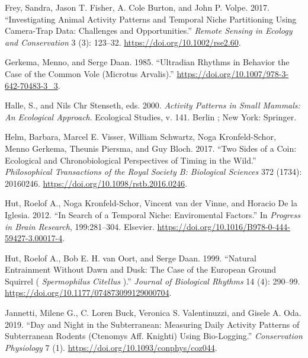 \documentclass[msc,numbers,hidelinks]{coppe}
\newlength{\cslhangindent}
\newenvironment{cslreferences}%
  {\setlength{\parindent}{0pt}%
  \everypar{\setlength{\hangindent}{\cslhangindent}}\ignorespaces}%
  {\par}
\begin{document}
\begin{cslreferences}
  \leavevmode\hypertarget{ref-freyInvestigatingAnimalActivity2017}{}%
  Frey, Sandra, Jason T. Fisher, A. Cole Burton, and John P. Volpe. 2017. ``Investigating Animal Activity Patterns and Temporal Niche Partitioning Using Camera-Trap Data: Challenges and Opportunities.'' \emph{Remote Sensing in Ecology and Conservation} 3 (3): 123--32. \url{https://doi.org/10.1002/rse2.60}.

  \leavevmode\hypertarget{ref-gerkemaUltradianRhythmsBehavior1985}{}%
  Gerkema, Menno, and Serge Daan. 1985. ``Ultradian Rhythms in Behavior the Case of the Common Vole (Microtus Arvalis).'' \url{https://doi.org/10.1007/978-3-642-70483-3_3}.

  \leavevmode\hypertarget{ref-halleActivityPatternsSmall2000}{}%
  Halle, S., and Nils Chr Stenseth, eds. 2000. \emph{Activity Patterns in Small Mammals: An Ecological Approach}. Ecological Studies, v. 141. Berlin ; New York: Springer.

  \leavevmode\hypertarget{ref-helmTwoSidesCoin2017}{}%
  Helm, Barbara, Marcel E. Visser, William Schwartz, Noga Kronfeld-Schor, Menno Gerkema, Theunis Piersma, and Guy Bloch. 2017. ``Two Sides of a Coin: Ecological and Chronobiological Perspectives of Timing in the Wild.'' \emph{Philosophical Transactions of the Royal Society B: Biological Sciences} 372 (1734): 20160246. \url{https://doi.org/10.1098/rstb.2016.0246}.

  \leavevmode\hypertarget{ref-hutSearchTemporalNiche2012}{}%
  Hut, Roelof A., Noga Kronfeld-Schor, Vincent van der Vinne, and Horacio De la Iglesia. 2012. ``In Search of a Temporal Niche: Enviromental Factors.'' In \emph{Progress in Brain Research}, 199:281--304. Elsevier. \url{https://doi.org/10.1016/B978-0-444-59427-3.00017-4}.

  \leavevmode\hypertarget{ref-hutNaturalEntrainmentDawn1999}{}%
  Hut, Roelof A., Bob E. H. van Oort, and Serge Daan. 1999. ``Natural Entrainment Without Dawn and Dusk: The Case of the European Ground Squirrel ( \emph{Spermophilus} \emph{Citellus} ).'' \emph{Journal of Biological Rhythms} 14 (4): 290--99. \url{https://doi.org/10.1177/074873099129000704}.

  \leavevmode\hypertarget{ref-jannettiDayNightSubterranean2019}{}%
  Jannetti, Milene G., C. Loren Buck, Veronica S. Valentinuzzi, and Gisele A. Oda. 2019. ``Day and Night in the Subterranean: Measuring Daily Activity Patterns of Subterranean Rodents (Ctenomys Aff. Knighti) Using Bio-Logging.'' \emph{Conservation Physiology} 7 (1). \url{https://doi.org/10.1093/conphys/coz044}.


\end{cslreferences}
\end{document}
